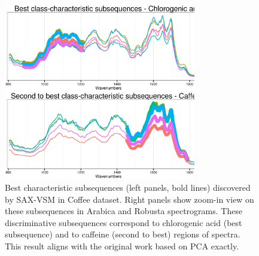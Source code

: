 \documentclass[conference]{IEEEtran}
\begin{document}
\begin{figure}[t]
   \centering
   \vspace{-0.2cm}
   \includegraphics[width=84mm]{figures/coffee_patterns.ps}
   \caption{
   Best characteristic subsequences (left panels, bold lines) discovered by SAX-VSM in
   {Coffee dataset}. Right panels show zoom-in view on these subsequences in Arabica
   and Robusta spectrograms.
   These discriminative subsequences correspond to chlorogenic acid (best subsequence) 
   and to caffeine (second to best) regions of spectra. This result aligns with
   the original work based on PCA \cite{coffee} exactly.
   }
   \label{fig:coffee}
   \vspace{-0.2cm}
\end{figure}


\end{document}
